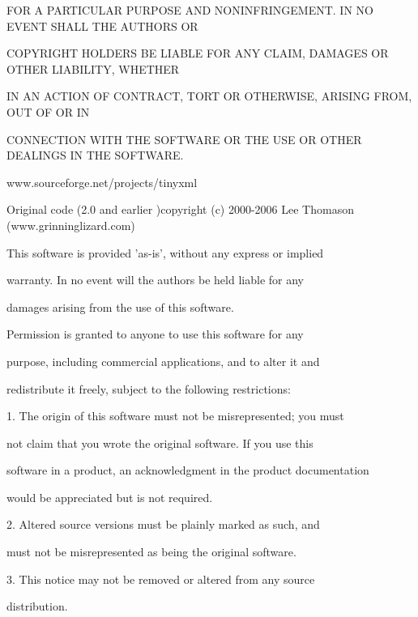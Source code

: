 FOR A PARTICULAR PURPOSE AND NONINFRINGEMENT. IN NO EVENT SHALL THE AUTHORS OR \par
 COPYRIGHT HOLDERS BE LIABLE FOR ANY CLAIM, DAMAGES OR OTHER LIABILITY, WHETHER \par
 IN AN ACTION OF CONTRACT, TORT OR OTHERWISE, ARISING FROM, OUT OF OR IN \par
 CONNECTION WITH THE SOFTWARE OR THE USE OR OTHER DEALINGS IN THE SOFTWARE. \par
\par
 www.sourceforge.net/projects/tinyxml \par
 Original code (2.0 and earlier )copyright (c) 2000-\/2006 Lee Thomason (www.grinninglizard.com) \par
 This software is provided 'as-\/is', without any express or implied \par
 warranty. In no event will the authors be held liable for any \par
 damages arising from the use of this software. \par
 \par
 Permission is granted to anyone to use this software for any \par
 purpose, including commercial applications, and to alter it and \par
 redistribute it freely, subject to the following restrictions: \par
 \par
 1. The origin of this software must not be misrepresented; you must \par
 not claim that you wrote the original software. If you use this \par
 software in a product, an acknowledgment in the product documentation \par
 would be appreciated but is not required. \par
 \par
 2. Altered source versions must be plainly marked as such, and \par
 must not be misrepresented as being the original software. \par
 \par
 3. This notice may not be removed or altered from any source \par
 distribution. \par
 \par
 
